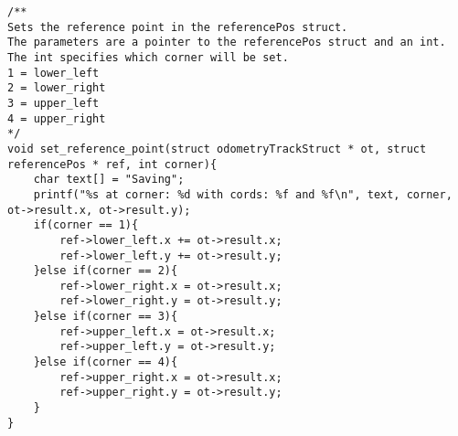 \begin{lstlisting}[caption={Function to save a new reference point to the reference struct}]
/**
Sets the reference point in the referencePos struct.
The parameters are a pointer to the referencePos struct and an int.
The int specifies which corner will be set.
1 = lower_left
2 = lower_right
3 = upper_left
4 = upper_right
*/
void set_reference_point(struct odometryTrackStruct * ot, struct referencePos * ref, int corner){
	char text[] = "Saving";
	printf("%s at corner: %d with cords: %f and %f\n", text, corner, ot->result.x, ot->result.y);
	if(corner == 1){
		ref->lower_left.x += ot->result.x;
		ref->lower_left.y += ot->result.y;
	}else if(corner == 2){
		ref->lower_right.x = ot->result.x;
		ref->lower_right.y = ot->result.y;
	}else if(corner == 3){
		ref->upper_left.x = ot->result.x;
		ref->upper_left.y = ot->result.y;
	}else if(corner == 4){
		ref->upper_right.x = ot->result.x;
		ref->upper_right.y = ot->result.y;
	}
}
\end{lstlisting}